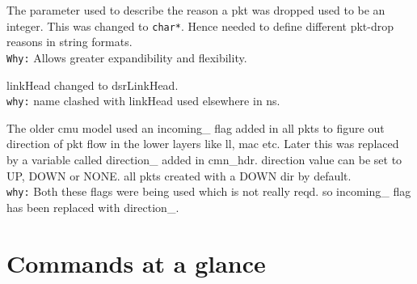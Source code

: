 \begin{flushleft}
The parameter used to describe the reason a pkt was dropped used to be an integer. This was changed to {\tt char*}. Hence needed to define different pkt-drop reasons in string formats. \\
{\tt Why:} Allows greater expandibility and flexibility.


linkHead changed to dsrLinkHead.\\
{\tt why:} name clashed with linkHead used elsewhere in ns.


The older cmu model used an incoming\_ flag added in all pkts to figure out direction of pkt flow in the lower layers like ll, mac etc. Later this was replaced by a variable called direction\_ added in cmn\_hdr. direction value can be set to UP, DOWN or NONE. all pkts created with a DOWN dir by default. \\
{\tt why:} Both these flags were being used which is not really reqd. so incoming\_ flag has been replaced with direction\_.

\end{flushleft}


\section{Commands at a glance}
\label{sec:wirelesscommand}

